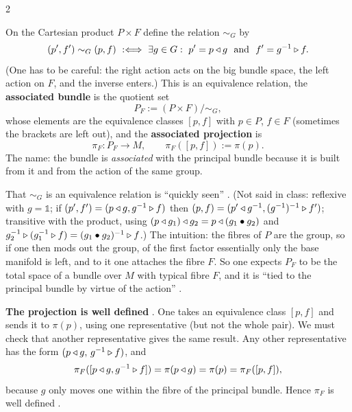 \begin{paracol}{2}
\begin{definition}\label{def:ab-assoc}
On the Cartesian product $P\times F$ define the relation $\sim_G$ by
\[
  (p',f')\sim_G(p,f)\ :\Longleftrightarrow\ \exists g\in G:\ p'=p\ract g\ \text{ and }\ f'=g^{-1}\lact f .
\]
(One has to be careful: the right action acts on the big bundle space, the left action on $F$, and the inverse enters.) This is an equivalence relation, the \textbf{associated bundle} is the quotient set
\[
  P_F:=(P\times F)/\!\sim_G ,
\]
whose elements are the equivalence classes $[p,f]$ with $p\in P$, $f\in F$ (sometimes the brackets are left out), and the \textbf{associated projection} is
\[
  \pi_F\colon P_F\to M,\qquad\pi_F([p,f]):=\pi(p) .
\]
The name: the bundle is \emph{associated} with the principal bundle because it is built from it and from the action of the same group.            
\end{definition}
That $\sim_G$ is an equivalence relation is ``quickly seen'' . (Not said in class: reflexive with $g=\mathbb 1$; if $(p',f')=(p\mathbin{\triangleleft} g,g^{-1}\mathbin{\triangleright} f)$ then $(p,f)=(p'\mathbin{\triangleleft} g^{-1},(g^{-1})^{-1}\mathbin{\triangleright} f')$; transitive with the product, using $(p\mathbin{\triangleleft} g_1)\mathbin{\triangleleft} g_2=p\mathbin{\triangleleft}(g_1\bullet g_2)$ and $g_2^{-1}\mathbin{\triangleright}(g_1^{-1}\mathbin{\triangleright} f)=(g_1\bullet g_2)^{-1}\mathbin{\triangleright} f$.) The intuition: the fibres of $P$ are the group, so if one then mods out the group, of the first factor essentially only the base manifold is left, and to it one attaches the fibre $F$. So one expects $P_F$ to be the total space of a bundle over $M$ with typical fibre $F$, and it is ``tied to the principal bundle by virtue of the action''     .

\textbf{The projection is well defined} . One takes an equivalence class $[p,f]$ and sends it to $\pi(p)$, using one representative (but not the whole pair). We must check that another representative gives the same result. Any other representative has the form $(p\mathbin{\triangleleft} g,\,g^{-1}\mathbin{\triangleright} f)$, and
\[
  \pi_F([p\mathbin{\triangleleft} g,g^{-1}\mathbin{\triangleright} f])=\pi(p\mathbin{\triangleleft} g)=\pi(p)=\pi_F([p,f]),
\]
because $g$ only moves one within the fibre of the principal bundle. Hence $\pi_F$ is well defined      .


\end{paracol}
